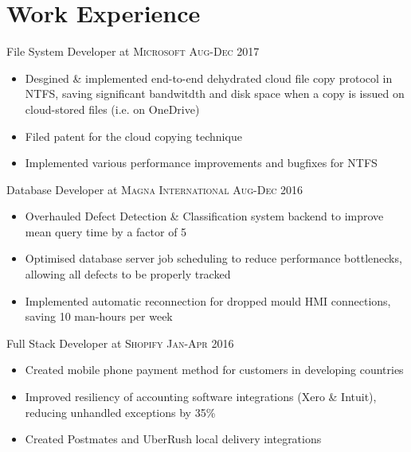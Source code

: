 \documentclass[a4paper,10pt]{article}
\begin{document}
\begin{minipage}[t]{0.66\textwidth} %

\section{Work Experience}



File System Developer at \textsc{Microsoft} \textsc{Aug-Dec 2017}

\begin{itemize}
    \item {\footnotesize{Desgined \& implemented end-to-end dehydrated cloud file copy protocol in NTFS, saving significant bandwitdth and disk space when a copy is issued on cloud-stored files (i.e. on OneDrive)}}
    \item {\footnotesize{Filed patent for the cloud copying technique}}
    \item {\footnotesize{Implemented various performance improvements and bugfixes for NTFS}}
\end{itemize}

Database Developer at \textsc{Magna International} \textsc{Aug-Dec 2016}
\begin{itemize}
    \item {\footnotesize{Overhauled Defect Detection \& Classification system backend to improve mean query time by a factor of 5}}
    \item {\footnotesize{Optimised database server job scheduling to reduce performance bottlenecks, allowing all defects to be properly tracked}}
    \item {\footnotesize{Implemented automatic reconnection for dropped mould HMI connections, saving 10 man-hours per week}}
\end{itemize}


Full Stack Developer at \textsc{Shopify}    \textsc{Jan-Apr 2016}
\begin{itemize}
    \item {\footnotesize{Created mobile phone payment method for customers in developing countries}}
    \item {\footnotesize{Improved resiliency of accounting software integrations (Xero \& Intuit), reducing unhandled exceptions by 35\%}}
    \item {\footnotesize{Created Postmates and UberRush local delivery integrations}}
\end{itemize}



\end{minipage}
\end{document}
